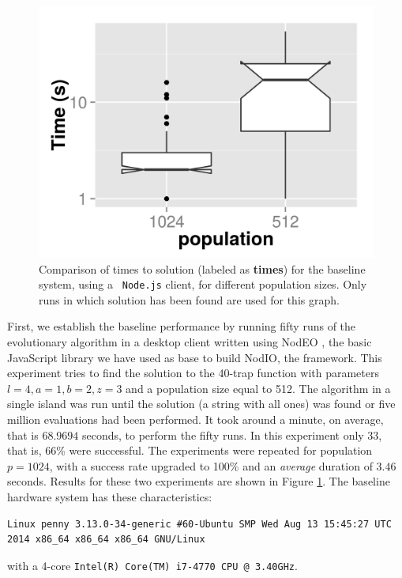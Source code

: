 \documentclass[journal,onecolumn]{IEEEtran}
\begin{document}
\begin{figure}[!t]
\centering
\includegraphics[width=12cm]{baseline-times.png}
\caption{Comparison of times to solution (labeled as {\bf times}) for the baseline system, using a {\tt
    Node.js} client, for different population sizes. Only
runs in which solution has been found are used for this graph.}
\label{fig:baseline}
\end{figure}
First, we establish the baseline performance by running fifty runs of the
evolutionary algorithm in a desktop client written using {\sf NodEO}
\cite{nodeo2014}, the basic JavaScript library we have used as base to
build {\sf NodIO}, the framework. This experiment tries to 
find the solution to the 40-trap function with parameters $l=4, a=1,
b=2, z=3$ and a population size equal to 512. The algorithm in a
single island was run until the solution (a string with all
ones) was found or five million evaluations had been performed. It
took around a minute, on average, that is $68.9694$ seconds, to
perform the fifty runs. In this experiment only 33, that is, 66\% were
successful. The experiments were repeated for population $p=1024$,
with a success rate upgraded to 100\% and an {\em average} duration of $3.46$
seconds. Results for these two experiments
are shown in Figure \ref{fig:baseline}. The baseline hardware system has these
characteristics: 
\begin{verbatim}
Linux penny 3.13.0-34-generic #60-Ubuntu SMP Wed Aug 13 15:45:27 UTC
2014 x86_64 x86_64 x86_64 GNU/Linux
\end{verbatim}
with a 4-core {\tt Intel(R) Core(TM) i7-4770 CPU @ 3.40GHz}.
\end{document}
